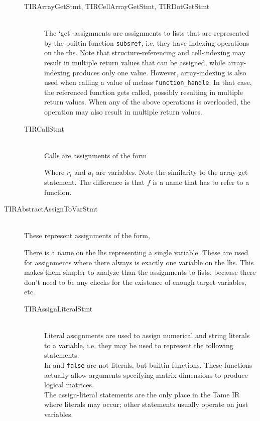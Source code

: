 \begin{description}
\begin{description}
\item[TIRArrayGetStmt, TIRCellArrayGetStmt, TIRDotGetStmt] \hfill \\
The `get'-assignments are assignments to lists that are represented
by the \matlab builtin function {\tt subsref}, i.e. they have
indexing operations on the rhs.
Note that structure-referencing and cell-indexing may result
in multiple return values that can be assigned, while
array-indexing produces only one value. However, array-indexing
is also used when calling a value of mclass {\tt function\_handle}.
In that case, the referenced function gets called, possibly
resulting in multiple return values. When any of the above operations
is overloaded, the operation may also result in multiple return values.

\item[TIRCallStmt] \hfill \\
Calls are assignments of the form

Where $r_i$ and $a_i$ are variables. Note the similarity to the
array-get statement. The difference is that $f$ is a name
that has to refer to a function.
\end{description}

\vspace{.5cm}
\item[TIRAbstractAssignToVarStmt] \hfill \\
These represent assignments of the form,

There is a name on the lhs representing a single variable. 
These are used for assignments where there always is exactly
one variable on the lhs. This makes them simpler to analyze
than the assignments to lists, because there don't need to be
any checks for the existence of enough target variables, etc.
\begin{description}
\item[TIRAssignLiteralStmt] \hfill \\
Literal assignments are used to assign numerical and string
literals to a variable, i.e. they may be used to represent
the following statements:
\\
In  and {\tt false} are not literals, but builtin
functions. These functions actually allow arguments specifying matrix
dimensions to produce logical matrices.\\
The assign-literal statements are the only place in the
Tame IR where literals may occur; other statements
usually operate on just variables.\\


\end{description}
\end{description}
